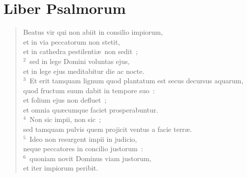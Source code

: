 {\centering \section*{Liber Psalmorum}}\thispagestyle{empty}

\begin{flushleft}\begin{verse}\vspace{-11pt}Beatus vir qui non abiit in consilio impiorum,\\ et in via peccatorum non stetit,\\ et in cathedra pestilenti\ae\ non sedit~;\\
${}^{2}$~sed in lege Domini voluntas ejus,\\ et in lege ejus meditabitur die ac nocte.\\
${}^{3}$~Et erit tamquam lignum quod plantatum est secus decursus aquarum,\\ quod fructum suum dabit in tempore suo~:\\ et folium ejus non defluet~;\\ et omnia qu\ae cumque faciet prosperabuntur.\\
${}^{4}$~Non sic impii, non sic~;\\ sed tamquam pulvis quem projicit ventus a facie terr\ae .\\
${}^{5}$~Ideo non resurgent impii in judicio,\\ neque peccatores in concilio justorum~:\\
${}^{6}$~quoniam novit Dominus viam justorum,\\ et iter impiorum peribit.\end{verse}\end{flushleft}


